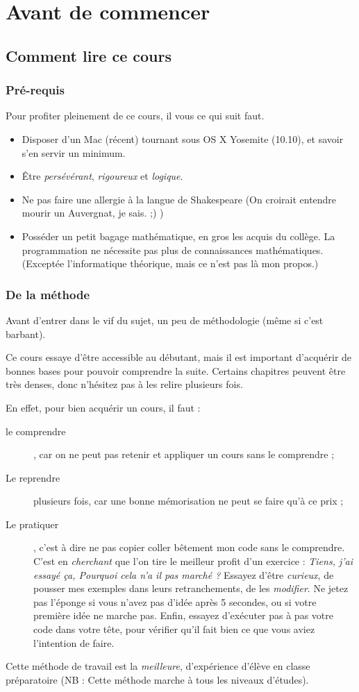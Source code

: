 \chapter{Avant de commencer}

\section{Comment lire ce cours}
\subsection{Pré-requis}
Pour profiter pleinement de ce cours, il vous ce qui suit faut.
\begin{itemize}
\item Disposer d'un Mac (récent) tournant sous OS X Yosemite (10.10),
et savoir s'en servir un minimum.
\item Être \emph{persévérant}, \emph{rigoureux} et \emph{logique}.
\item Ne pas faire une allergie à la langue de Shakespeare
(On croirait entendre mourir un Auvergnat, je sais. ;) )
\item Posséder un petit bagage mathématique, en gros les acquis du collège.
La programmation ne nécessite pas plus de connaissances mathématiques.
(Exceptée l'informatique théorique, mais ce n'est pas là mon propos.) 
\end{itemize}

\subsection{De la méthode}
Avant d'entrer dans le vif du sujet,
un peu de méthodologie (même si c'est barbant).


Ce cours essaye d'être accessible au débutant,
mais il est important d'acquérir de bonnes bases
pour pouvoir comprendre la suite.
Certains chapitres peuvent être très denses,
donc n'hésitez pas à les relire plusieurs fois.


En effet, pour bien acquérir un cours, il faut :
\begin{description}
\item[le comprendre],
car on ne peut pas retenir et appliquer un cours sans le comprendre ;
\item[Le reprendre] plusieurs fois,
car une bonne mémorisation ne peut se faire qu'à ce prix ;
\item[Le pratiquer],
c'est à dire ne pas copier coller bêtement mon code sans le comprendre.
C'est en \emph{cherchant} que l'on tire le meilleur profit d'un exercice :
\og \emph{Tiens, j'ai essayé ça, Pourquoi cela n'a il pas marché ?} \fg{}
Essayez d'être \emph{curieux}, de pousser mes exemples dans leurs retranchements,
de les \emph{modifier}. Ne jetez pas l'éponge si vous n'avez pas d'idée après 5 secondes,
ou si votre première idée ne marche pas.
Enfin, essayez d'exécuter pas à pas votre code dans votre tête,
pour vérifier qu'il fait bien ce que vous aviez l'intention de faire.
\end{description}
Cette méthode de travail est la \emph{meilleure}, d'expérience d'élève en classe préparatoire
(NB : Cette méthode marche à tous les niveaux d'études).
